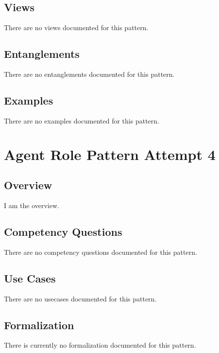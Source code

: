 \subsection{Views}
\label{ssec:views}
There are no views documented for this pattern.


\subsection{Entanglements}
\label{ssec:entanglements}
There are no entanglements documented for this pattern.

\subsection{Examples}
\label{ssec:examples}
There are no examples documented for this pattern.


\section{Agent Role Pattern Attempt 4}
\label{sec:agent-role-pattern-attempt-4}
\subsection{Overview}
\label{ssec:overview}
I am the overview.

\subsection{Competency Questions}
\label{ssec:cqs}
There are no competency questions documented for this pattern.

\subsection{Use Cases}
\label{ssec:use-cases}
There are no usecases documented for this pattern.
\subsection{Formalization}
\label{ssec:formalization}
There is currently no formalization documented for this pattern.

